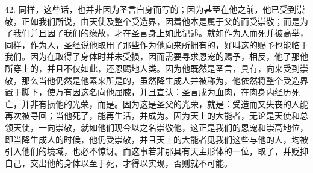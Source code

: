 42. 同样，这些话，也并非因为圣言自身而写的；因为甚至在他之前，他已受到崇敬，正如我们所说，由天使及整个受造界，因着他本是属于父的而受崇敬；而是为了我们并且因了我们的缘故，才在圣言身上如此记述。就如作为人而死并被高举，同样，作为人，圣经说他取用了那些作为他向来所拥有的，好叫这的赐予也能临于我们。因为在取得了身体时并未受损，因而需要寻求恩宠的赐予，相反，他了那他所穿上的，并且不仅如此，还恩赐地人类。因为他既然是圣言，具有，向来受到崇敬，那么当他仍然是他素来所是的，虽然降生成人并被称为，他依然将整个受造界置于脚下，使万有因这名向他屈膝，并且宣认：圣言成为血肉，在肉身内经历死亡，并非有损他的光荣，而是。因为这是圣父的光荣，就是：受造而又失丧的人能再次被寻回；当他死了，能再生活，并成为。因为天上的大能者，无论是天使和总领天使，一向崇敬，就如他们现今以之名崇敬他，这正是我们的恩宠和崇高地位，即当降生成人的时候，他仍受崇敬，并且天上的大能者见我们这些与他的人，均被引入他们的境域，也必不惊讶。而这事若非那具有天主形体的一位，取了，并贬抑自己，交出他的身体以至于死，才得以实现，否则就不可能。\par

